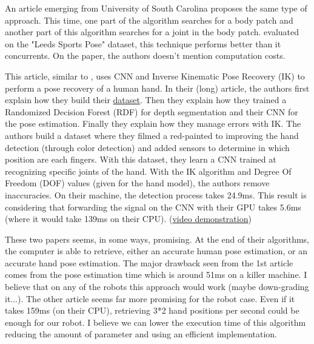 \documentclass[a4paper]{article}
\begin{document}
			An article\cite{fan2015combining} emerging from University of South Carolina proposes the same type of approach. This time, one part of the algorithm searches for a body patch and another part of this algorithm searches for a joint in the body patch. evaluated on the "Leeds Sports Pose" dataset, this technique performs better than it concurrents. On the paper, the authors doesn't mention computation costs.


			This article\cite{tompson2014real}, similar to \cite{tompson2014joint}, uses CNN and Inverse Kinematic Pose Recovery (IK) to perform a pose recovery of a human hand. In their (long) article, the authors first explain how they build their \href{http://cims.nyu.edu/~tompson/NYU_Hand_Pose_Dataset.htm}{dataset}. Then they explain how they trained a Randomized Decision Forest (RDF) for depth segmentation and their CNN for the pose estimation. Finally they explain how they manage errors with IK. The authors build a dataset where they filmed a red-painted to improving the hand detection (through color detection) and added sensors to determine in which position are each fingers. With this dataset, they learn a CNN trained at recognizing specific joints of the hand. With the IK algorithm and Degree Of Freedom (DOF) values (given for the hand model), the authors remove inaccuracies. On their machine, the detection process takes 24.9ms. This result is considering that forwarding the signal on the CNN with their GPU takes 5.6ms (where it would take 139ms on their CPU). (\href{https://www.youtube.com/watch?v=J4c_x1QnW0A}{video demonstration})


			\begin{mdframed}[backgroundcolor = gray!30]
				These two papers seems, in some ways, promising. At the end of their algorithms, the computer is able to retrieve, either an accurate human pose estimation, or an accurate hand pose estimation. The major drawback seen from the 1st article comes from the pose estimation time which is around 51ms on a killer machine. I believe that on any of the robots this approach would work (maybe down-grading it...). The other article seems far more promising for the robot case. Even if it takes 159ms (on their CPU), retrieving 3*2 hand positions per second could be enough for our robot. I believe we can lower the execution time of this algorithm reducing the amount of parameter and using an efficient implementation\cite{jin2014efficient}.
			\end{mdframed}
\end{document}
